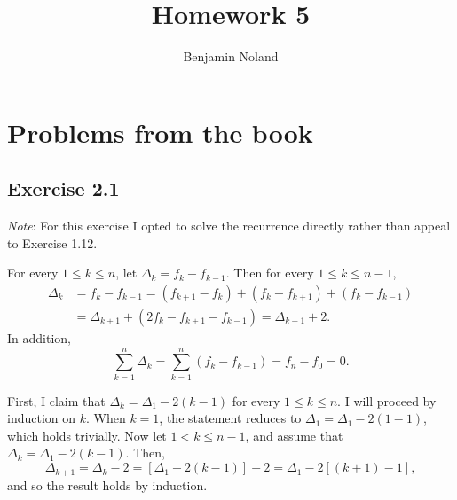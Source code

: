\documentclass[12pt]{article}
\title{Homework 5}
\author{Benjamin Noland}
\date{}
\begin{document}
\maketitle

\section*{Problems from the book}

\subsection*{Exercise 2.1}

\textit{Note}: For this exercise I opted to solve the recurrence directly rather than appeal to Exercise 1.12.

For every $1 \leq k \leq n$, let $\Delta_k = f_k - f_{k-1}$. Then for every $1 \leq k \leq n-1$,
\begin{align*}
\Delta_k &= f_k - f_{k-1} = (f_{k+1} - f_k) + (f_k - f_{k+1}) + (f_k - f_{k-1}) \\
&= \Delta_{k+1} + (2f_k - f_{k+1} - f_{k-1}) = \Delta_{k+1} + 2.
\end{align*}
In addition,
\begin{equation*}
\sum_{k=1}^n \Delta_k = \sum_{k=1}^n (f_k - f_{k-1}) = f_n - f_0 = 0.
\end{equation*}

First, I claim that $\Delta_k = \Delta_1 - 2(k-1)$ for every $1 \leq k \leq n$. I will proceed by induction on $k$. When $k = 1$, the statement reduces to $\Delta_1 = \Delta_1 - 2(1-1)$, which holds trivially. Now let $1 < k \leq n-1$, and assume that $\Delta_k = \Delta_1 - 2(k-1)$. Then,
\begin{equation*}
\Delta_{k+1} = \Delta_k - 2 = [\Delta_1 - 2(k-1)] - 2 = \Delta_1 - 2[(k+1) - 1],
\end{equation*}
and so the result holds by induction.
\end{document}
